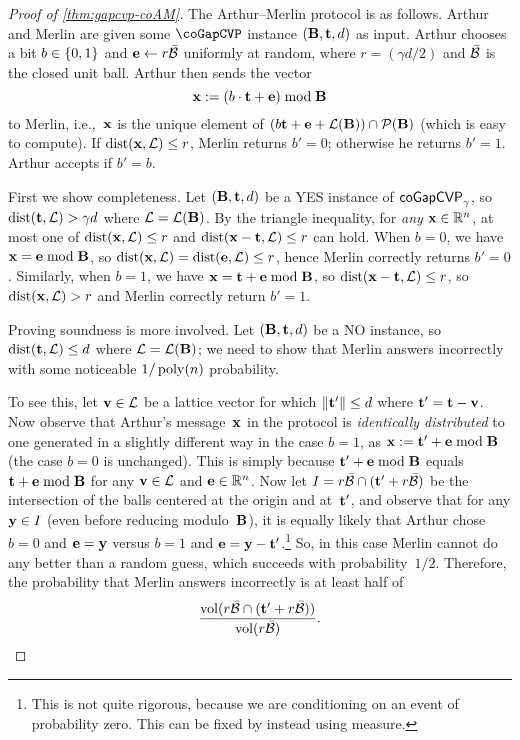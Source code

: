 \documentclass[11pt]{article}
\begin{document}
\begin{proof}[Proof of \cref{thm:gapcvp-coAM}]
  The Arthur--Merlin protocol is as follows. Arthur and Merlin are
  given some $\coGapCVP$ instance $(\matB, \vect, d)$ as input. Arthur
  chooses a bit $b \in \bit$ and $\vece \leftarrow r \bar{\cal{B}}$
  uniformly at random, where $r = (\gamma d/2)$ and $\bar{\cal{B}}$ is
  the closed unit ball. Arthur then sends the vector
  \[ \vecx := (b\cdot \vect + \vece) \bmod \matB \] to Merlin,
  i.e.,~$\vecx$ is the unique element of
  $(b \vect + \vece + \lat(\matB)) \cap \piped(\matB)$ (which is easy
  to compute). If $\dist(\vecx, \lat) \leq r$, Merlin returns
  $b' = 0$; otherwise he returns $b'=1$. Arthur accepts if $b' = b$.

  First we show completeness. Let $(\matB, \vect, d)$ be a YES
  instance of $\cogapcvp_{\gamma}$, so $\dist(\vect, \lat) > \gamma d$
  where $\lat=\lat(\matB)$. By the triangle inequality, for \emph{any}
  $\vecx \in \R^{n}$, at most one of $\dist(\vecx, \lat) \leq r$ and
  $\dist(\vecx - \vect, \lat) \leq r$ can hold. When $b=0$, we have
  $\vecx = \vece \bmod \matB$, so
  $\dist(\vecx,\lat) = \dist(\vece,\lat) \leq r$, hence Merlin
  correctly returns $b'=0$. Similarly, when $b=1$, we have
  $\vecx = \vect + \vece \bmod \matB$, so
  $\dist(\vecx - \vect, \lat) \leq r$, so $\dist(\vecx,\lat) > r$ and
  Merlin correctly return $b'=1$.

  Proving soundness is more involved. Let $(\matB, \vect, d)$ be a NO
  instance, so $\dist(\vect,\lat) \leq d$ where $\lat=\lat(\matB)$; we
  need to show that Merlin answers incorrectly with some noticeable
  $1/\poly(n)$ probability.

  To see this, let $\vecv \in \lat$ be a lattice vector for which
  $\length{\vect'} \leq d$ where $\vect' = \vect - \vecv$. Now observe
  that Arthur's message~$\vecx$ in the protocol is \emph{identically
    distributed} to one generated in a slightly different way in the
  case $b=1$, as $\vecx := \vect' + \vece \bmod \matB$ (the case $b=0$
  is unchanged). This is simply because $\vect' + \vece \bmod \matB$
  equals $\vect + \vece \bmod \matB$ for any $\vecv \in \lat$ and
  $\vece \in \R^{n}$. Now let
  $I = r \bar{\cal{B}} \cap (\vect' + r \bar{\cal{B}})$ be the
  intersection of the balls centered at the origin and at~$\vect'$,
  and observe that for any $\vecy \in I$ (even before reducing
  modulo~$\matB$), it is equally likely that Arthur chose $b=0$ and
  $\vece=\vecy$ versus $b=1$ and $\vece=\vecy-\vect'$.\footnote{This
    is not quite rigorous, because we are conditioning on an event of
    probability zero. This can be fixed by instead using measure.} So,
  in this case Merlin cannot do any better than a random guess, which
  succeeds with probability~$1/2$. Therefore, the probability that
  Merlin answers incorrectly is at least half of
  \begin{equation}
    \label{eq:ratio-ball-intersection}
    \frac{\vol(r \bar{\cal{B}} \cap (\vect' + r
      \bar{\cal{B}}))}{\vol(r \bar{\cal{B}})} .
  \end{equation}


\end{proof}
\end{document}

